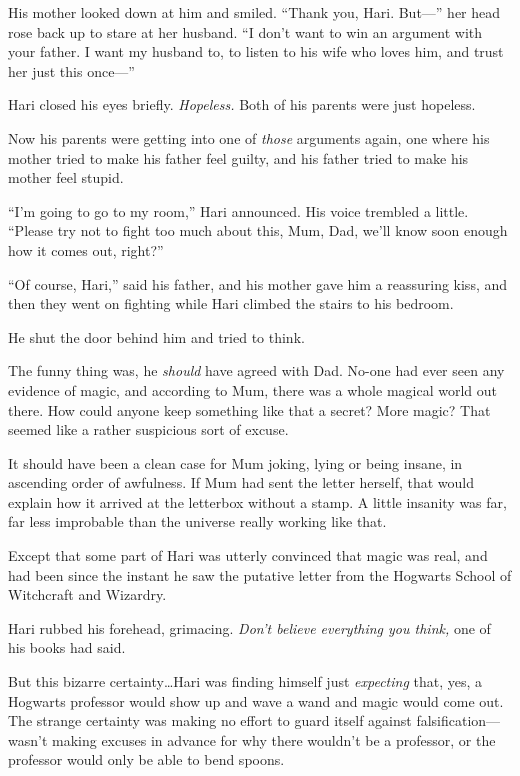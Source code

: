 His mother looked down at him and smiled. “Thank you, Hari. But—” her head rose back up to stare at her husband. “I don’t want to win an argument with your father. I want my husband to, to listen to his wife who loves him, and trust her just this once—”

Hari closed his eyes briefly. \emph{Hopeless.} Both of his parents were just hopeless.

Now his parents were getting into one of \emph{those} arguments again, one where his mother tried to make his father feel guilty, and his father tried to make his mother feel stupid.

“I’m going to go to my room,” Hari announced. His voice trembled a little. “Please try not to fight too much about this, Mum, Dad, we’ll know soon enough how it comes out, right?”

“Of course, Hari,” said his father, and his mother gave him a reassuring kiss, and then they went on fighting while Hari climbed the stairs to his bedroom.

He shut the door behind him and tried to think.

The funny thing was, he \emph{should} have agreed with Dad. No-one had ever seen any evidence of magic, and according to Mum, there was a whole magical world out there. How could anyone keep something like that a secret? More magic? That seemed like a rather suspicious sort of excuse.

It should have been a clean case for Mum joking, lying or being insane, in ascending order of awfulness. If Mum had sent the letter herself, that would explain how it arrived at the letterbox without a stamp. A little insanity was far, far less improbable than the universe really working like that.

Except that some part of Hari was utterly convinced that magic was real, and had been since the instant he saw the putative letter from the Hogwarts School of Witchcraft and Wizardry.

Hari rubbed his forehead, grimacing. \emph{Don’t believe everything you think,} one of his books had said.

But this bizarre certainty…Hari was finding himself just \emph{expecting} that, yes, a Hogwarts professor would show up and wave a wand and magic would come out. The strange certainty was making no effort to guard itself against falsification—wasn’t making excuses in advance for why there wouldn’t be a professor, or the professor would only be able to bend spoons.

